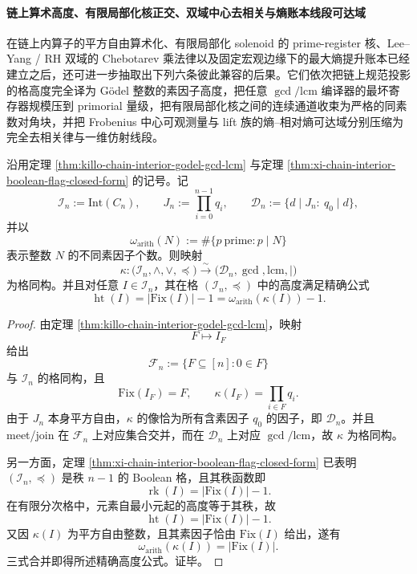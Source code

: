 \paragraph{链上算术高度、有限局部化核正交、双域中心去相关与熵账本线段可达域}
在链上内算子的平方自由算术化、有限局部化 solenoid 的 prime-register 核、Lee--Yang / RH 双域的 Chebotarev 乘法律以及固定宏观边缘下的最大熵提升账本已经建立之后，还可进一步抽取出下列六条彼此兼容的后果。它们依次把链上规范投影的格高度完全译为 Gödel 整数的素因子高度，把任意 \(\gcd/\mathrm{lcm}\) 编译器的最坏寄存器规模压到 primorial 量级，把有限局部化核之间的连续通道收束为严格的同素数对角块，并把 Frobenius 中心可观测量与 lift 族的熵--相对熵可达域分别压缩为完全去相关律与一维仿射线段。

\begin{theorem}[链上规范投影的完全算术化与精确高度公式]\label{thm:xi-time-part9zl-chain-arithmetic-height-formula}
沿用定理 \ref{thm:killo-chain-interior-godel-gcd-lcm} 与定理 \ref{thm:xi-chain-interior-boolean-flag-closed-form} 的记号。记
\[
\mathcal I_n:=\mathrm{Int}(C_n),
\qquad
J_n:=\prod_{i=0}^{n-1}q_i,
\qquad
\mathcal D_n:=\{d\mid J_n:\ q_0\mid d\},
\]
并以
\[
\omega_{\mathrm{arith}}(N):=\#\{p\ \text{prime}: p\mid N\}
\]
表示整数 \(N\) 的不同素因子个数。则映射
\[
\kappa:\bigl(\mathcal I_n,\wedge,\vee,\preceq\bigr)
\xrightarrow{\sim}
\bigl(\mathcal D_n,\gcd,\mathrm{lcm},\mid\bigr)
\]
为格同构。并且对任意 \(I\in\mathcal I_n\)，其在格 \((\mathcal I_n,\preceq)\) 中的高度满足精确公式
\[
\operatorname{ht}(I)
=
|\mathrm{Fix}(I)|-1
=
\omega_{\mathrm{arith}}(\kappa(I))-1.
\]
\end{theorem}
\begin{proof}
由定理 \ref{thm:killo-chain-interior-godel-gcd-lcm}，映射
\[
F\longmapsto I_F
\]
给出
\[
\mathcal F_n:=\{F\subseteq[n]:0\in F\}
\]
与 \(\mathcal I_n\) 的格同构，且
\[
\mathrm{Fix}(I_F)=F,
\qquad
\kappa(I_F)=\prod_{i\in F}q_i.
\]
由于 \(J_n\) 本身平方自由，\(\kappa\) 的像恰为所有含素因子 \(q_0\) 的因子，即 \(\mathcal D_n\)。并且 meet/join 在 \(\mathcal F_n\) 上对应集合交并，而在 \(\mathcal D_n\) 上对应 \(\gcd/\mathrm{lcm}\)，故 \(\kappa\) 为格同构。

另一方面，定理 \ref{thm:xi-chain-interior-boolean-flag-closed-form} 已表明 \((\mathcal I_n,\preceq)\) 是秩 \(n-1\) 的 Boolean 格，且其秩函数即
\[
\operatorname{rk}(I)=|\mathrm{Fix}(I)|-1.
\]
在有限分次格中，元素自最小元起的高度等于其秩，故
\[
\operatorname{ht}(I)=|\mathrm{Fix}(I)|-1.
\]
又因 \(\kappa(I)\) 为平方自由整数，且其素因子恰由 \(\mathrm{Fix}(I)\) 给出，遂有
\[
\omega_{\mathrm{arith}}(\kappa(I))=|\mathrm{Fix}(I)|.
\]
三式合并即得所述精确高度公式。证毕。
\end{proof}

